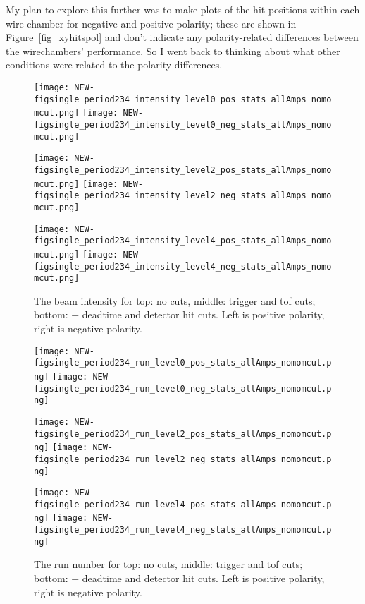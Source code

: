 My plan to explore this further was to make plots of the hit positions within each wire chamber for negative and positive polarity; these are shown in Figure~\ref{fig_xyhitspol} and don't indicate any polarity-related differences between the wirechambers' performance. So I went back to thinking about what other conditions were related to the polarity differences.


  \begin{figure}[h]
  
     	\texttt{[image: NEW-figsingle\_period234\_intensity\_level0\_pos\_stats\_allAmps\_nomomcut.png]}
	 \texttt{[image: NEW-figsingle\_period234\_intensity\_level0\_neg\_stats\_allAmps\_nomomcut.png]}
	 
   	\texttt{[image: NEW-figsingle\_period234\_intensity\_level2\_pos\_stats\_allAmps\_nomomcut.png]}
	 \texttt{[image: NEW-figsingle\_period234\_intensity\_level2\_neg\_stats\_allAmps\_nomomcut.png]}
	 
 	\texttt{[image: NEW-figsingle\_period234\_intensity\_level4\_pos\_stats\_allAmps\_nomomcut.png]}
	 \texttt{[image: NEW-figsingle\_period234\_intensity\_level4\_neg\_stats\_allAmps\_nomomcut.png]}
   \caption[short]{The beam intensity for top: no cuts, middle: trigger and tof cuts; bottom: + deadtime and detector hit cuts. Left is positive polarity, right is negative polarity.}
   \label{fig_intensity}
  \end{figure}
 
  \begin{figure}[h]
  
     	\texttt{[image: NEW-figsingle\_period234\_run\_level0\_pos\_stats\_allAmps\_nomomcut.png]}
	 \texttt{[image: NEW-figsingle\_period234\_run\_level0\_neg\_stats\_allAmps\_nomomcut.png]}
	 
   	\texttt{[image: NEW-figsingle\_period234\_run\_level2\_pos\_stats\_allAmps\_nomomcut.png]}
	 \texttt{[image: NEW-figsingle\_period234\_run\_level2\_neg\_stats\_allAmps\_nomomcut.png]}
	 
 	\texttt{[image: NEW-figsingle\_period234\_run\_level4\_pos\_stats\_allAmps\_nomomcut.png]}
	 \texttt{[image: NEW-figsingle\_period234\_run\_level4\_neg\_stats\_allAmps\_nomomcut.png]}
   \caption[short]{The run number for top: no cuts, middle: trigger and tof cuts; bottom: + deadtime and detector hit cuts. Left is positive polarity, right is negative polarity.}
   \label{fig_intensity}
  \end{figure}
  
